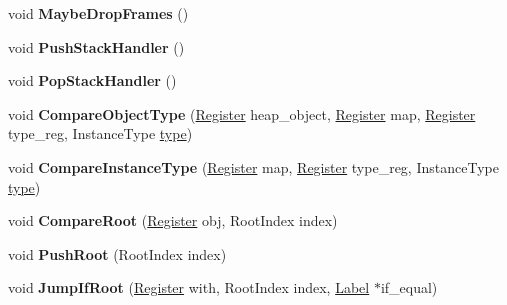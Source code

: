\begin{DoxyCompactItemize}
void {\bfseries Maybe\+Drop\+Frames} ()
\item 
\mbox{\label{classv8_1_1internal_1_1MacroAssembler_af8ec8c2c3c525fa27b47125b8f2c90fb}} 
void {\bfseries Push\+Stack\+Handler} ()
\item 
\mbox{\label{classv8_1_1internal_1_1MacroAssembler_aaec1b780d52416c78d49b94483afa4f8}} 
void {\bfseries Pop\+Stack\+Handler} ()
\item 
\mbox{\label{classv8_1_1internal_1_1MacroAssembler_a3c12ff43e4dc21fa5a9ddc0384641ed0}} 
void {\bfseries Compare\+Object\+Type} (\mbox{\hyperlink{classv8_1_1internal_1_1Register}{Register}} heap\+\_\+object, \mbox{\hyperlink{classv8_1_1internal_1_1Register}{Register}} map, \mbox{\hyperlink{classv8_1_1internal_1_1Register}{Register}} type\+\_\+reg, Instance\+Type \mbox{\hyperlink{classstd_1_1conditional_1_1type}{type}})
\item 
\mbox{\label{classv8_1_1internal_1_1MacroAssembler_a18c4f37a00c2903da694afa03f600688}} 
void {\bfseries Compare\+Instance\+Type} (\mbox{\hyperlink{classv8_1_1internal_1_1Register}{Register}} map, \mbox{\hyperlink{classv8_1_1internal_1_1Register}{Register}} type\+\_\+reg, Instance\+Type \mbox{\hyperlink{classstd_1_1conditional_1_1type}{type}})
\item 
\mbox{\label{classv8_1_1internal_1_1MacroAssembler_a3642eebbecf811ee033559ce6556ef25}} 
void {\bfseries Compare\+Root} (\mbox{\hyperlink{classv8_1_1internal_1_1Register}{Register}} obj, Root\+Index index)
\item 
\mbox{\label{classv8_1_1internal_1_1MacroAssembler_a91239e2f90525c993ce4dacef2b8219c}} 
void {\bfseries Push\+Root} (Root\+Index index)
\item 
\mbox{\label{classv8_1_1internal_1_1MacroAssembler_a026e7752dc80a8ac2c86242c713de128}} 
void {\bfseries Jump\+If\+Root} (\mbox{\hyperlink{classv8_1_1internal_1_1Register}{Register}} with, Root\+Index index, \mbox{\hyperlink{classv8_1_1internal_1_1Label}{Label}} $\ast$if\+\_\+equal)

\end{DoxyCompactItemize}
